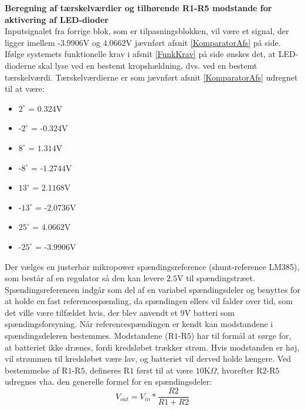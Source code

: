 \noindent\textbf{Beregning af tærskelværdier og tilhørende R1-R5 modstande for aktivering af LED-dioder} \\
Inputsignalet fra forrige blok, som er tilpasningsblokken, vil være et signal, der ligger imellem -$3.9906$V og $4.0662$V jævnført afsnit \ref{KomparatorAfs} på side\pageref{KomparatorAfs}. Ifølge systemets funktionelle krav i afsnit \ref{FunkKrav} på side \pageref{FunkKrav} ønskes det, at LED-dioderne skal lyse ved en bestemt kropshældning, dvs. ved en bestemt tærskelværdi. %
Tærskelværdierne er som jævnført afsnit \ref{KomparatorAfs} udregnet til at være:
\begin{itemize}
\item $2^{\circ}$ = $0.324$V
\item -$2^{\circ}$ = -$0.324$V
\item $8^{\circ}$ = $1.314$V
\item -$8^{\circ}$ = -$1.2744$V
\item $13^{\circ}$ = $2.1168$V
\item -$13^{\circ}$ = -$2.0736$V
\item $25^{\circ}$ = $4.0662$V
\item -$25^{\circ}$ = -$3.9906$V
\end{itemize}
Der vælges en justerbar mikropower spændingsreference (shunt-reference LM385), som består af en regulator så den kan levere $2.5$V til spændingstræet. Spændingsreferencen indgår som del af en variabel spændingsdeler og benyttes for at holde en fast referencespænding, da spændingen ellers vil falder over tid, som det ville være tilfældet hvis, der blev anvendt et $9$V batteri som spændingsforsyning.
Når referencespændingen er kendt kan modstandene i spændingsdeleren bestemmes. Modstandene (R$1$-R$5$) har til formål at sørge for, at batteriet ikke drænes, fordi kredsløbet trækker strøm. Hvis modstanden er høj, vil strømmen til kredsløbet være lav, og batteriet vil derved holde længere.
Ved bestemmelse af R$1$-R$5$, defineres R$1$ først til at være $10$K$\Omega$, hvorefter R$2$-R$5$ udregnes vha. den generelle formel for en spændingsdeler:
\begin{equation}
V_{out}=V_{in}*\dfrac{R2}{R1+R2}
\end{equation}

